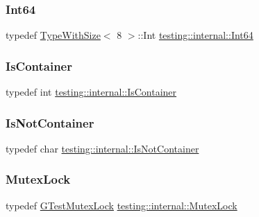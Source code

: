 \subsubsection{\texorpdfstring{Int64}{Int64}}
{\footnotesize\ttfamily typedef \mbox{\hyperlink{classtesting_1_1internal_1_1_type_with_size}{Type\+With\+Size}}$<$ 8 $>$\+::Int \mbox{\hyperlink{namespacetesting_1_1internal_abd4adb4f2e2d7078a473de91a4089501}{testing\+::internal\+::\+Int64}}}

\mbox{\label{namespacetesting_1_1internal_ad8f0c2883245f1df2a53618a49f0deb3}} 
\subsubsection{\texorpdfstring{IsContainer}{IsContainer}}
{\footnotesize\ttfamily typedef int \mbox{\hyperlink{namespacetesting_1_1internal_ad8f0c2883245f1df2a53618a49f0deb3}{testing\+::internal\+::\+Is\+Container}}}

\mbox{\label{namespacetesting_1_1internal_abf080521ce135deb510e0a7830fd3d33}} 
\subsubsection{\texorpdfstring{IsNotContainer}{IsNotContainer}}
{\footnotesize\ttfamily typedef char \mbox{\hyperlink{namespacetesting_1_1internal_abf080521ce135deb510e0a7830fd3d33}{testing\+::internal\+::\+Is\+Not\+Container}}}

\mbox{\label{namespacetesting_1_1internal_a08b187c6cc4e28400aadf9a32fccc8de}} 
\subsubsection{\texorpdfstring{MutexLock}{MutexLock}}
{\footnotesize\ttfamily typedef \mbox{\hyperlink{classtesting_1_1internal_1_1_g_test_mutex_lock}{G\+Test\+Mutex\+Lock}} \mbox{\hyperlink{namespacetesting_1_1internal_a08b187c6cc4e28400aadf9a32fccc8de}{testing\+::internal\+::\+Mutex\+Lock}}}


